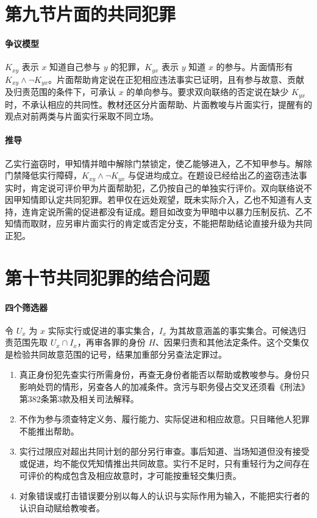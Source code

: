 \section{第九节\quad 片面的共同犯罪}

\paragraph{争议模型}
\(K_{xy}\) 表示 \(x\) 知道自己参与 \(y\) 的犯罪，\(K_{yx}\) 表示 \(y\) 知道 \(x\) 的参与。片面情形有 \(K_{xy}\land\neg K_{yx}\)。片面帮助肯定说在正犯相应违法事实已证明，且有参与故意、贡献及归责范围的条件下，可承认 \(x\) 的单向参与。要求双向联络的否定说在缺少 \(K_{yx}\) 时，不承认相应的共同性。教材还区分片面帮助、片面教唆与片面实行，提醒有的观点对前两类与片面实行采取不同立场。

\paragraph{推导}
乙实行盗窃时，甲知情并暗中解除门禁锁定，使乙能够进入，乙不知甲参与。解除门禁降低实行障碍，\(K_{xy}\land\neg K_{yx}\) 与促进均成立。在题设已经给出乙的盗窃违法事实时，肯定说可评价甲为片面帮助犯，乙仍按自己的单独实行评价。双向联络说不因甲知情即认定共同犯罪。若甲仅在远处观望，既未实际介入，乙也不知道有人支持，连肯定说所需的促进都没有证成。题目如改变为甲暗中以暴力压制反抗、乙不知情而取财，应另审片面实行的肯定或否定分支，不能把帮助结论直接升级为共同正犯。

\section{第十节\quad 共同犯罪的结合问题}

\paragraph{四个筛选器}
令 \(U_x\) 为 \(x\) 实际实行或促进的事实集合，\(I_x\) 为其故意涵盖的事实集合。可候选归责范围先取 \(U_x\cap I_x\)，再审各罪的身份 \(H\)、因果归责和其他法定条件。这个交集仅是检验共同故意范围的记号，结果加重部分另查法定罪过。
\begin{enumerate}
\item 真正身份犯先查实行所需身份，再查无身份者能否以帮助或教唆参与。身份只影响处罚的情形，另查各人的加减条件。贪污与职务侵占交叉还须看《刑法》第382条第3款及相关司法解释。
\item 不作为参与须查特定义务、履行能力、实际促进和相应故意。只目睹他人犯罪不能推出帮助。
\item 实行过限应对超出共同计划的部分另行审查。事后知道、当场知道但没有接受或促进，均不能仅凭知情推出共同故意。实行不足时，只有重轻行为之间存在可评价的构成包含及相应故意时，才可能按重轻交集归责。
\item 对象错误或打击错误要分别以每人的认识与实际作用为输入，不能把实行者的认识自动赋给教唆者。
\end{enumerate}

